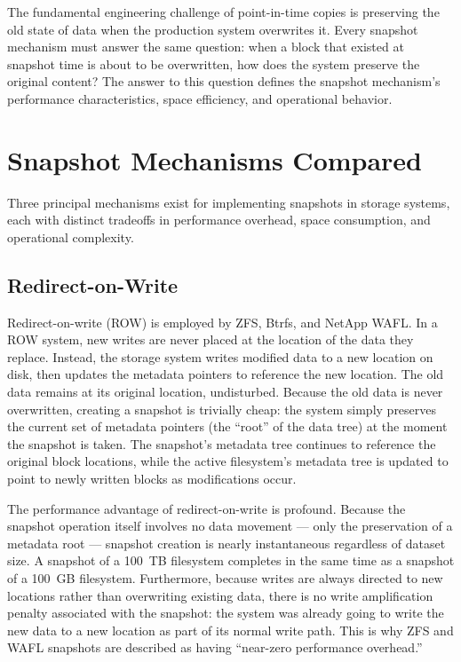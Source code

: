 The fundamental engineering challenge of point-in-time copies is preserving the old state of data when the production system overwrites it. Every snapshot mechanism must answer the same question: when a block that existed at snapshot time is about to be overwritten, how does the system preserve the original content? The answer to this question defines the snapshot mechanism's performance characteristics, space efficiency, and operational behavior.

\section{Snapshot Mechanisms Compared}

Three principal mechanisms exist for implementing snapshots in storage systems, each with distinct tradeoffs in performance overhead, space consumption, and operational complexity.

\subsection{Redirect-on-Write}

Redirect-on-write (ROW) is employed by ZFS, Btrfs, and NetApp WAFL. In a ROW system, new writes are never placed at the location of the data they replace. Instead, the storage system writes modified data to a new location on disk, then updates the metadata pointers to reference the new location. The old data remains at its original location, undisturbed. Because the old data is never overwritten, creating a snapshot is trivially cheap: the system simply preserves the current set of metadata pointers (the ``root'' of the data tree) at the moment the snapshot is taken. The snapshot's metadata tree continues to reference the original block locations, while the active filesystem's metadata tree is updated to point to newly written blocks as modifications occur.

The performance advantage of redirect-on-write is profound. Because the snapshot operation itself involves no data movement --- only the preservation of a metadata root --- snapshot creation is nearly instantaneous regardless of dataset size. A snapshot of a 100~TB filesystem completes in the same time as a snapshot of a 100~GB filesystem. Furthermore, because writes are always directed to new locations rather than overwriting existing data, there is no write amplification penalty associated with the snapshot: the system was already going to write the new data to a new location as part of its normal write path. This is why ZFS and WAFL snapshots are described as having ``near-zero performance overhead.''

